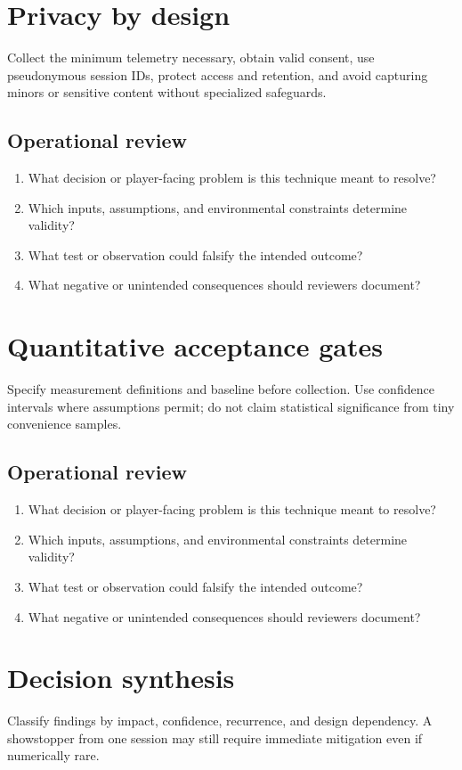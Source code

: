 \documentclass[11pt]{article}
\begin{document}
\section{Privacy by design}
Collect the minimum telemetry necessary, obtain valid consent, use pseudonymous session IDs, protect access and retention, and avoid capturing minors or sensitive content without specialized safeguards.


\subsection{Operational review}
\begin{enumerate}
\item What decision or player-facing problem is this technique meant to resolve?
\item Which inputs, assumptions, and environmental constraints determine validity?
\item What test or observation could falsify the intended outcome?
\item What negative or unintended consequences should reviewers document?
\end{enumerate}

\section{Quantitative acceptance gates}
Specify measurement definitions and baseline before collection. Use confidence intervals where assumptions permit; do not claim statistical significance from tiny convenience samples.


\subsection{Operational review}
\begin{enumerate}
\item What decision or player-facing problem is this technique meant to resolve?
\item Which inputs, assumptions, and environmental constraints determine validity?
\item What test or observation could falsify the intended outcome?
\item What negative or unintended consequences should reviewers document?
\end{enumerate}

\section{Decision synthesis}
Classify findings by impact, confidence, recurrence, and design dependency. A showstopper from one session may still require immediate mitigation even if numerically rare.
\end{document}
